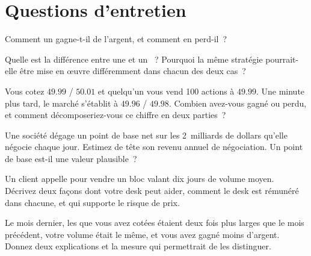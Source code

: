\section{Questions d'entretien}

\begin{interviewq}\label{iq:m1:what-a-trading-firm-does:1}
Comment un  gagne-t-il de l'argent, et comment en perd-il~?
\end{interviewq}

\begin{interviewq}\label{iq:m1:what-a-trading-firm-does:2}
Quelle est la différence entre une  et un ~?
Pourquoi la même stratégie pourrait-elle être mise en œuvre différemment dans chacun des deux cas~?
\end{interviewq}

\begin{interviewq}\label{iq:m1:what-a-trading-firm-does:3}
Vous cotez $49.99$ / $50.01$ et quelqu'un vous vend 100 actions à
$49.99$. Une minute plus tard, le marché s'établit à $49.96$ / $49.98$. Combien avez-vous
gagné ou perdu, et comment décomposeriez-vous ce chiffre en deux parties~?
\end{interviewq}

\begin{interviewq}\label{iq:m1:what-a-trading-firm-does:4}
Une société dégage un point de base net sur les 2~milliards de dollars qu'elle négocie chaque jour. Estimez
de tête son revenu annuel de négociation. Un point de base est-il une
valeur plausible~?
\end{interviewq}

\begin{interviewq}\label{iq:m1:what-a-trading-firm-does:5}
Un client appelle pour vendre un bloc valant dix jours de volume moyen. Décrivez
deux façons dont votre desk peut aider, comment le desk est rémunéré dans chacune, et qui supporte le
risque de prix.
\end{interviewq}

\begin{interviewq}\label{iq:m1:what-a-trading-firm-does:6}
Le mois dernier, les  que vous avez cotées étaient deux fois plus larges que le mois précédent,
votre volume était le même, et vous avez gagné moins d'argent. Donnez deux explications et
la mesure qui permettrait de les distinguer.
\end{interviewq}
